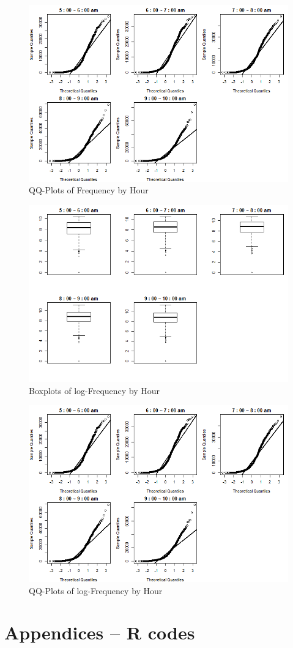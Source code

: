 \documentclass[hidelinks,12pt]{article}
\begin{document}
	\begin{figure}[!ht]
		\includegraphics[width=\textwidth]{qq.png}
		\caption{QQ-Plots of Frequency by Hour \label{fig:qq}}
	\end{figure}
	\begin{figure}[!ht]
		\includegraphics[width=\textwidth]{box_log.png}
		\caption{Boxplots of log-Frequency by Hour \label{fig:lgboxplot}}
	\end{figure}
	\begin{figure}[!ht]
		\includegraphics[width=\textwidth]{qq.png}
		\caption{QQ-Plots of log-Frequency by Hour \label{fig:lgqq}}
	\end{figure}

	\section{Appendices -- R codes}
	\begin{verbatim}
		
	\end{verbatim}
	
\end{document}
